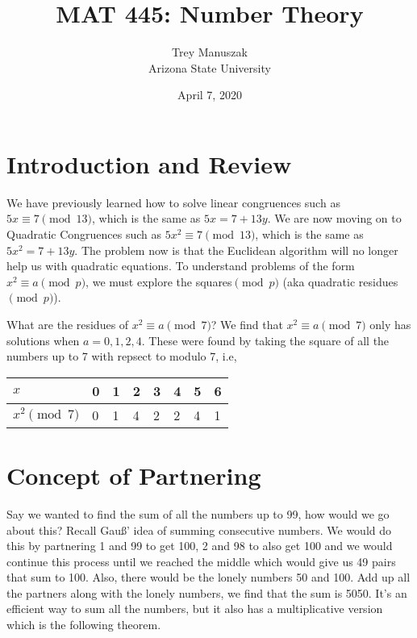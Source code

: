 \documentclass[12pt]{article}
\title{MAT 445: Number Theory}
\date{April 7, 2020}
\author{Trey Manuszak\\ Arizona State University}
\newenvironment{example}[2][Example]{\begin{trivlist}
\item[\hskip \labelsep {\bfseries #1}\hskip \labelsep {\bfseries #2}]}{\end{trivlist}}
\begin{document}

\section{Introduction and Review}

\hspace{1em} We have previously learned how to solve linear congruences such as $5x \equiv 7 \pmod{13}$, which is the same as $5x = 7 + 13y$. We are now moving on to Quadratic Congruences such as $5x^2 \equiv 7 \pmod{13}$, which is the same as $5x^2 = 7+13y$. The problem now is that the Euclidean algorithm will no longer help us with quadratic equations. To understand problems of the form $x^2 \equiv a \pmod{p}$, we must explore the squares$\pmod{p}$ (aka quadratic residues$\pmod{p}$). 

\begin{example}{1 (Quadratic Residues (mod \textit{\textbf{p}}))}
What are the residues of $x^2 \equiv a \pmod{7}$? We find that $x^2 \equiv a \pmod{7}$ only has solutions when $a = 0,1,2,4$. These were found by taking the square of all the numbers up to 7 with repsect to modulo 7, i.e, 
\begin{table}[!htbp]
  \centering
  \begin{tabular}{|l|l|l|l|l|l|l|l|}
  \hline
  $x$ & 0 & 1 & 2 & 3 & 4 & 5 & 6 \\ \hline
  $x^2 \pmod{7}$ & 0 & 1 & 4 & 2 & 2 & 4 & 1 \\ \hline
  \end{tabular}
  \end{table}
\end{example}

\section{Concept of Partnering}

\hspace{1em} Say we wanted to find the sum of all the numbers up to 99, how would we go about this? Recall Gau{\ss}' idea of summing consecutive numbers. We would do this by partnering 1 and 99 to get 100, 2 and 98 to also get 100 and we would continue this process until we reached the middle which would give us 49 pairs that sum to 100. Also, there would be the lonely numbers 50 and 100. Add up all the partners along with the lonely numbers, we find that the sum is 5050. It’s an efficient way to sum all the numbers, but it also has a multiplicative version which is the following theorem.
\end{document}
